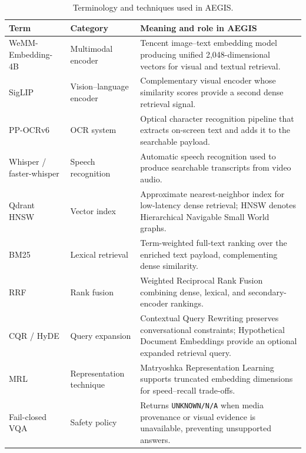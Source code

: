 \documentclass[a4paper,10pt]{article}
\begin{document}
\begin{table}[ht]
\centering
\small
\caption{Terminology and techniques used in AEGIS.}
\label{tab:terminology}
\begin{tabularx}{\textwidth}{>{\raggedright\arraybackslash}p{3.0cm} >{\raggedright\arraybackslash}p{3.0cm} X}
\toprule
\textbf{Term} & \textbf{Category} & \textbf{Meaning and role in AEGIS} \\
\midrule
WeMM-Embedding-4B & Multimodal encoder & Tencent image--text embedding model producing unified 2,048-dimensional vectors for visual and textual retrieval. \\
SigLIP & Vision--language encoder & Complementary visual encoder whose similarity scores provide a second dense retrieval signal. \\
PP-OCRv6 & OCR system & Optical character recognition pipeline that extracts on-screen text and adds it to the searchable payload. \\
Whisper / faster-whisper & Speech recognition & Automatic speech recognition used to produce searchable transcripts from video audio. \\
Qdrant HNSW & Vector index & Approximate nearest-neighbor index for low-latency dense retrieval; HNSW denotes Hierarchical Navigable Small World graphs. \\
BM25 & Lexical retrieval & Term-weighted full-text ranking over the enriched text payload, complementing dense similarity. \\
RRF & Rank fusion & Weighted Reciprocal Rank Fusion combining dense, lexical, and secondary-encoder rankings. \\
CQR / HyDE & Query expansion & Contextual Query Rewriting preserves conversational constraints; Hypothetical Document Embeddings provide an optional expanded retrieval query. \\
MRL & Representation technique & Matryoshka Representation Learning supports truncated embedding dimensions for speed--recall trade-offs. \\
Fail-closed VQA & Safety policy & Returns \texttt{UNKNOWN/N/A} when media provenance or visual evidence is unavailable, preventing unsupported answers. \\
\bottomrule
\end{tabularx}
\end{table}
\end{document}

